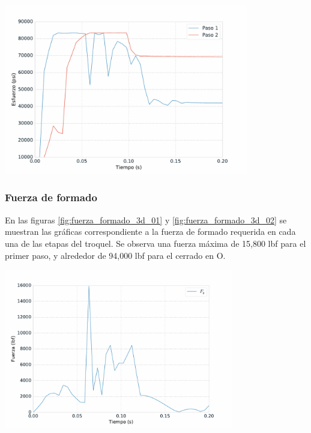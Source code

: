 \begin{center}
\includegraphics[width=0.8\textwidth]{src/ch4/von_mises_3d_all.pdf}
\label{fig:von_mises_3d_all}
\end{center}



\subsubsection{Fuerza de formado}

En las figuras \ref{fig:fuerza_formado_3d_01} y \ref{fig:fuerza_formado_3d_02} se muestran las gráficas 
correspondiente a la fuerza de formado requerida en cada una de las etapas del troquel. Se observa una 
fuerza máxima de 15,800 lbf para el primer paso, y alrededor de 94,000 lbf para el cerrado en O.

\begin{center}
\includegraphics[width=0.75\textwidth]{src/ch4/fuerza_formado_3d_01.pdf}
\label{fig:fuerza_formado_3d_01}
\end{center}

